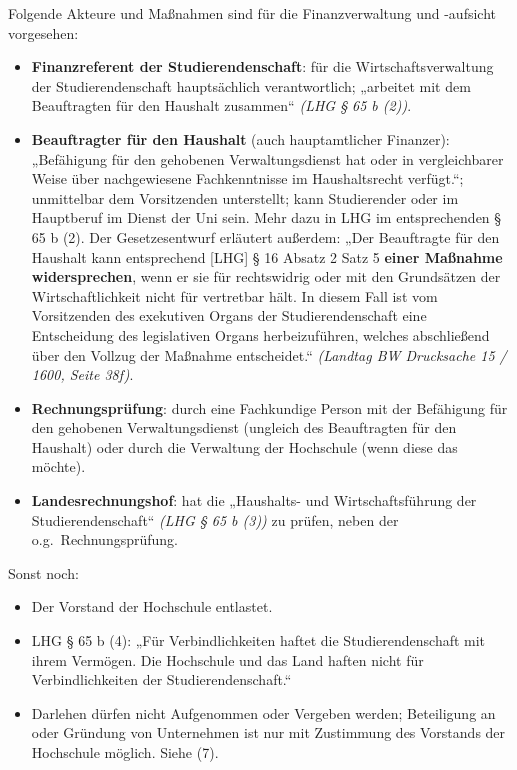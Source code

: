 \documentclass[
10pt,
a4paper,
twoside,								%
titlepage=false,							%
draft=false								%
]{scrartcl}
\begin{document}
Folgende Akteure und Maßnahmen sind für die Finanzverwaltung und -aufsicht vorgesehen:
\begin{itemize}
	\item \textbf{Finanzreferent der Studierendenschaft}: für die Wirtschaftsverwaltung der Studierendenschaft hauptsächlich verantwortlich; „arbeitet mit dem Beauftragten für den Haushalt zusammen“ \textit{(LHG § 65 b (2))}.
	\item \textbf{Beauftragter für den Haushalt} (auch hauptamtlicher Finanzer): „Befähigung für den gehobenen Verwaltungsdienst hat oder in vergleichbarer Weise über nachgewiesene Fachkenntnisse im Haushaltsrecht verfügt.“; unmittelbar dem Vorsitzenden unterstellt; kann Studierender oder im Hauptberuf im Dienst der Uni sein. Mehr dazu in LHG im entsprechenden § 65 b (2). Der Gesetzesentwurf erläutert außerdem: „Der Beauftragte für den Haushalt kann entsprechend [LHG] § 16 Absatz 2 Satz 5 \textbf{einer Maßnahme widersprechen}, wenn er sie für rechtswidrig oder mit den Grundsätzen der Wirtschaftlichkeit nicht für vertretbar hält. In diesem Fall ist vom Vorsitzenden des exekutiven Organs der Studierendenschaft eine Entscheidung des legislativen Organs herbeizuführen, welches abschließend über den Vollzug der Maßnahme entscheidet.“ \textit{(Landtag BW Drucksache 15 / 1600, Seite 38f)}.
	\item \textbf{Rechnungsprüfung}: durch eine Fachkundige Person mit der Befähigung für den gehobenen Verwaltungsdienst (ungleich des Beauftragten für den Haushalt) oder durch die Verwaltung der Hochschule (wenn diese das möchte).
	\item \textbf{Landesrechnungshof}: hat die „Haushalts- und Wirtschaftsführung der Studierendenschaft“ \textit{(LHG § 65 b (3))} zu prüfen, neben der o.g.~Rechnungsprüfung.
\end{itemize}

Sonst noch:
\begin{itemize}
	\item Der Vorstand der Hochschule entlastet.
	\item LHG § 65 b (4): „Für Verbindlichkeiten haftet die Studierendenschaft mit ihrem Vermögen. Die Hochschule und das Land haften nicht für Verbindlichkeiten der Studierendenschaft.“
	\item Darlehen dürfen nicht Aufgenommen oder Vergeben werden; Beteiligung an oder Gründung von Unternehmen ist nur mit Zustimmung des Vorstands der Hochschule möglich. Siehe (7).
\end{itemize}
\end{document}
